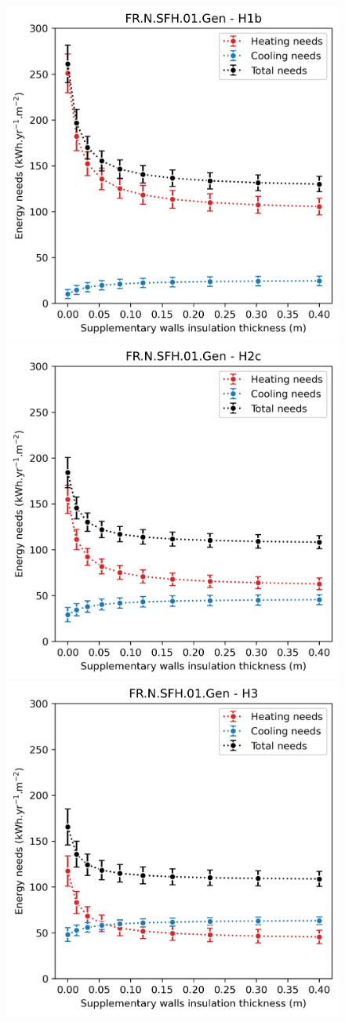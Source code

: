 \documentclass[11pt]{article}
\begin{document}
            \begin{figure}[ht]
                \centering
                \includegraphics[width=0.32\columnwidth]{figures/walls_FR.N.SFH.01.Gen_H1b_conventionnel_th-bce_2020_2000-2020.png}
                \includegraphics[width=0.32\columnwidth]{figures/walls_FR.N.SFH.01.Gen_H2c_conventionnel_th-bce_2020_2000-2020.png}
                \includegraphics[width=0.32\columnwidth]{figures/walls_FR.N.SFH.01.Gen_H3_conventionnel_th-bce_2020_2000-2020.png}\\

\end{figure}
\end{document}

